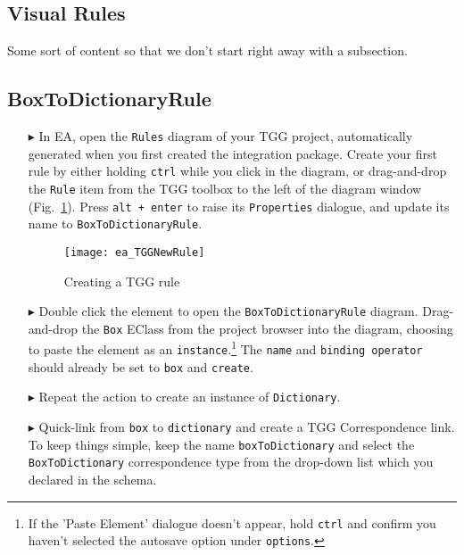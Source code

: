 \newpage
\hypertarget{rules vis}{}
\subsection{Visual Rules}
\visHeader

Some sort of content so that we don't start right away with a subsection.

\subsection{BoxToDictionaryRule}

\begin{enumerate}

\item[$\blacktriangleright$] In EA, open the \texttt{Rules} diagram of your TGG project, automatically generated when you first created the integration package.
Create your first rule by either holding \texttt{ctrl} while you click in the diagram, or drag-and-drop the \texttt{Rule} item from the TGG toolbox to the left
of the diagram window (Fig.~\ref{fig:create_tgg_rule}). Press \texttt{alt + enter} to raise its \texttt{Properties} dialogue, and update its name to
\texttt{BoxToDictionaryRule}.

\vspace{0.5cm}

\begin{figure}[htbp]
\begin{center}
  \texttt{[image: ea\_TGGNewRule]}
  \caption{Creating a TGG rule}
  \label{fig:create_tgg_rule}
\end{center}
\end{figure}

\item[$\blacktriangleright$] Double click the element to open the \texttt{BoxToDictionaryRule} diagram. Drag-and-drop the \texttt{Box} EClass from the project
browser into the diagram, choosing to paste the element as an \texttt{instance}.\footnote{If the 'Paste Element' dialogue doesn't appear, hold \texttt{ctrl} and
confirm you haven't selected the autosave option under \texttt{options}.} The \texttt{name} and \texttt{binding operator} should already be set to \texttt{box}
and \texttt{create}.

\item[$\blacktriangleright$] Repeat the action to create an instance of \texttt{Dictionary}.

\item[$\blacktriangleright$] Quick-link from \texttt{box} to \texttt{dictionary} and create a TGG Correspondence link. To keep things simple, keep the name 
\texttt{boxToDictionary} and select the \texttt{BoxToDictionary} correspondence type from the drop-down list which you declared in the schema.


\end{enumerate}
